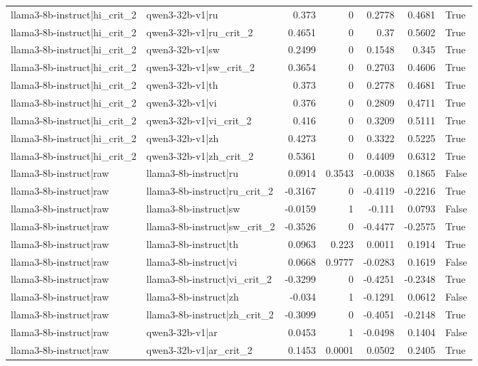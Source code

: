 \begin{table}
\begin{tabular}{l l r r r r l}
llama3-8b-instruct|hi_crit_2 & qwen3-32b-v1|ru & 0.373 & 0 & 0.2778 & 0.4681 & True \\
llama3-8b-instruct|hi_crit_2 & qwen3-32b-v1|ru_crit_2 & 0.4651 & 0 & 0.37 & 0.5602 & True \\
llama3-8b-instruct|hi_crit_2 & qwen3-32b-v1|sw & 0.2499 & 0 & 0.1548 & 0.345 & True \\
llama3-8b-instruct|hi_crit_2 & qwen3-32b-v1|sw_crit_2 & 0.3654 & 0 & 0.2703 & 0.4606 & True \\
llama3-8b-instruct|hi_crit_2 & qwen3-32b-v1|th & 0.373 & 0 & 0.2778 & 0.4681 & True \\
llama3-8b-instruct|hi_crit_2 & qwen3-32b-v1|vi & 0.376 & 0 & 0.2809 & 0.4711 & True \\
llama3-8b-instruct|hi_crit_2 & qwen3-32b-v1|vi_crit_2 & 0.416 & 0 & 0.3209 & 0.5111 & True \\
llama3-8b-instruct|hi_crit_2 & qwen3-32b-v1|zh & 0.4273 & 0 & 0.3322 & 0.5225 & True \\
llama3-8b-instruct|hi_crit_2 & qwen3-32b-v1|zh_crit_2 & 0.5361 & 0 & 0.4409 & 0.6312 & True \\
llama3-8b-instruct|raw & llama3-8b-instruct|ru & 0.0914 & 0.3543 & -0.0038 & 0.1865 & False \\
llama3-8b-instruct|raw & llama3-8b-instruct|ru_crit_2 & -0.3167 & 0 & -0.4119 & -0.2216 & True \\
llama3-8b-instruct|raw & llama3-8b-instruct|sw & -0.0159 & 1 & -0.111 & 0.0793 & False \\
llama3-8b-instruct|raw & llama3-8b-instruct|sw_crit_2 & -0.3526 & 0 & -0.4477 & -0.2575 & True \\
llama3-8b-instruct|raw & llama3-8b-instruct|th & 0.0963 & 0.223 & 0.0011 & 0.1914 & True \\
llama3-8b-instruct|raw & llama3-8b-instruct|vi & 0.0668 & 0.9777 & -0.0283 & 0.1619 & False \\
llama3-8b-instruct|raw & llama3-8b-instruct|vi_crit_2 & -0.3299 & 0 & -0.4251 & -0.2348 & True \\
llama3-8b-instruct|raw & llama3-8b-instruct|zh & -0.034 & 1 & -0.1291 & 0.0612 & False \\
llama3-8b-instruct|raw & llama3-8b-instruct|zh_crit_2 & -0.3099 & 0 & -0.4051 & -0.2148 & True \\
llama3-8b-instruct|raw & qwen3-32b-v1|ar & 0.0453 & 1 & -0.0498 & 0.1404 & False \\
llama3-8b-instruct|raw & qwen3-32b-v1|ar_crit_2 & 0.1453 & 0.0001 & 0.0502 & 0.2405 & True \\

\end{tabular}
\end{table}
